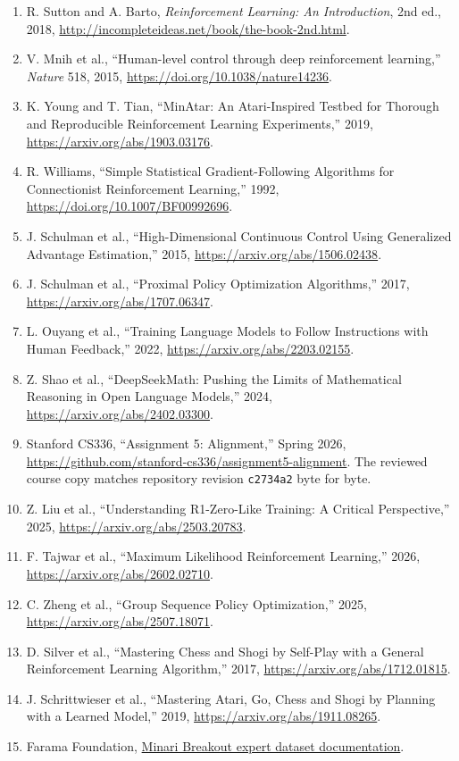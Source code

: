 \documentclass[11pt]{article}
\begin{document}
\begin{enumerate}
\item R. Sutton and A. Barto, \emph{Reinforcement Learning: An Introduction},
2nd ed., 2018, \url{http://incompleteideas.net/book/the-book-2nd.html}.
\item V. Mnih et al., ``Human-level control through deep reinforcement
learning,'' \emph{Nature} 518, 2015,
\url{https://doi.org/10.1038/nature14236}.
\item K. Young and T. Tian, ``MinAtar: An Atari-Inspired Testbed for Thorough
and Reproducible Reinforcement Learning Experiments,'' 2019,
\url{https://arxiv.org/abs/1903.03176}.
\item R. Williams, ``Simple Statistical Gradient-Following Algorithms for
Connectionist Reinforcement Learning,'' 1992,
\url{https://doi.org/10.1007/BF00992696}.
\item J. Schulman et al., ``High-Dimensional Continuous Control Using
Generalized Advantage Estimation,'' 2015, \url{https://arxiv.org/abs/1506.02438}.
\item J. Schulman et al., ``Proximal Policy Optimization Algorithms,'' 2017,
\url{https://arxiv.org/abs/1707.06347}.
\item L. Ouyang et al., ``Training Language Models to Follow Instructions with
Human Feedback,'' 2022, \url{https://arxiv.org/abs/2203.02155}.
\item Z. Shao et al., ``DeepSeekMath: Pushing the Limits of Mathematical
Reasoning in Open Language Models,'' 2024, \url{https://arxiv.org/abs/2402.03300}.
\item Stanford CS336, ``Assignment 5: Alignment,'' Spring 2026,
\url{https://github.com/stanford-cs336/assignment5-alignment}.  The reviewed
course copy matches repository revision \texttt{c2734a2} byte for byte.
\item Z. Liu et al., ``Understanding R1-Zero-Like Training: A Critical
Perspective,'' 2025, \url{https://arxiv.org/abs/2503.20783}.
\item F. Tajwar et al., ``Maximum Likelihood Reinforcement Learning,'' 2026,
\url{https://arxiv.org/abs/2602.02710}.
\item C. Zheng et al., ``Group Sequence Policy Optimization,'' 2025,
\url{https://arxiv.org/abs/2507.18071}.
\item D. Silver et al., ``Mastering Chess and Shogi by Self-Play with a General
Reinforcement Learning Algorithm,'' 2017,
\url{https://arxiv.org/abs/1712.01815}.
\item J. Schrittwieser et al., ``Mastering Atari, Go, Chess and Shogi by Planning
with a Learned Model,'' 2019, \url{https://arxiv.org/abs/1911.08265}.
\item Farama Foundation, \href{https://minari.farama.org/main/datasets/atari/breakout/expert-v0/}
{Minari Breakout expert dataset documentation}.
\end{enumerate}
\end{document}
